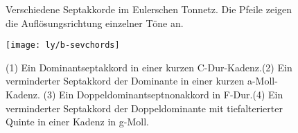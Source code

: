 \begin{figure}
  \centering
  
  \caption{Verschiedene Septakkorde im Eulerschen Tonnetz. Die Pfeile zeigen die
    Auflösungsrichtung einzelner Töne an.}\label{fig:chordLinessevenths}
\end{figure}

\begin{figure}
	\centering
	\texttt{[image: ly/b-sevchords]}
	\caption{(1) Ein Dominantseptakkord in einer kurzen C-Dur-Kadenz.\quad (2) Ein
    verminderter Septakkord der Dominante in einer kurzen a-Moll-Kadenz.\quad
    (3) Ein Doppeldominantseptnonakkord in F-Dur.\quad (4) Ein verminderter
    Septakkord der Doppeldominante mit tiefalterierter Quinte in einer Kadenz in
    g-Moll.}\label{fig:sevchords}
\end{figure}

